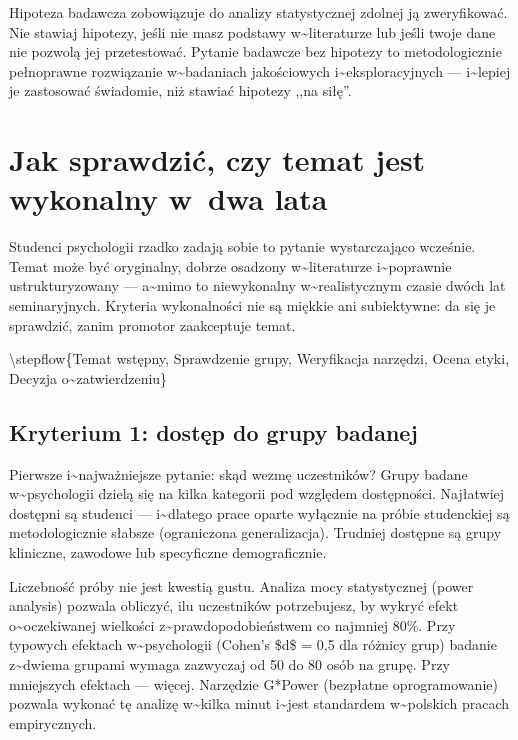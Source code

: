 \documentclass[12pt,a4paper,twoside,openany]{book}
\let\bforigsection\section
\renewcommand{\section}{\needspace{4\baselineskip}\bforigsection}
\begin{document}
\begin{keyinsight} Hipoteza badawcza zobowiązuje do analizy statystycznej zdolnej ją zweryfikować. Nie stawiaj hipotezy, jeśli nie masz podstawy w\textasciitilde{}literaturze lub jeśli twoje dane nie pozwolą jej przetestować. Pytanie badawcze bez hipotezy to metodologicznie pełnoprawne rozwiązanie w\textasciitilde{}badaniach jakościowych i\textasciitilde{}eksploracyjnych --- i\textasciitilde{}lepiej je zastosować świadomie, niż stawiać hipotezy ,,na siłę''.
\end{keyinsight}


\section{Jak sprawdzić, czy temat jest wykonalny w~dwa lata}


Studenci psychologii rzadko zadają sobie to pytanie wystarczająco wcześnie. Temat może być oryginalny, dobrze osadzony w\textasciitilde{}literaturze i\textasciitilde{}poprawnie ustrukturyzowany --- a\textasciitilde{}mimo to niewykonalny w\textasciitilde{}realistycznym czasie dwóch lat seminaryjnych. Kryteria wykonalności nie są miękkie ani subiektywne: da się je sprawdzić, zanim promotor zaakceptuje temat.


\textbackslash{}stepflow\{Temat wstępny, Sprawdzenie grupy, Weryfikacja narzędzi, Ocena etyki, Decyzja o\textasciitilde{}zatwierdzeniu\}


\subsection{Kryterium 1: dostęp do grupy badanej}


Pierwsze i\textasciitilde{}najważniejsze pytanie: skąd wezmę uczestników? Grupy badane w\textasciitilde{}psychologii dzielą się na kilka kategorii pod względem dostępności. Najłatwiej dostępni są studenci --- i\textasciitilde{}dlatego prace oparte wyłącznie na próbie studenckiej są metodologicznie słabsze (ograniczona generalizacja). Trudniej dostępne są grupy kliniczne, zawodowe lub specyficzne demograficznie.


Liczebność próby nie jest kwestią gustu. Analiza mocy statystycznej (power analysis) pozwala obliczyć, ilu uczestników potrzebujesz, by wykryć efekt o\textasciitilde{}oczekiwanej wielkości z\textasciitilde{}prawdopodobieństwem co najmniej 80\%. Przy typowych efektach w\textasciitilde{}psychologii (Cohen's \$d\$ = 0,5 dla różnicy grup) badanie z\textasciitilde{}dwiema grupami wymaga zazwyczaj od 50 do 80 osób na grupę. Przy mniejszych efektach --- więcej. Narzędzie G*Power (bezpłatne oprogramowanie) pozwala wykonać tę analizę w\textasciitilde{}kilka minut i\textasciitilde{}jest standardem w\textasciitilde{}polskich pracach empirycznych.
\end{document}
